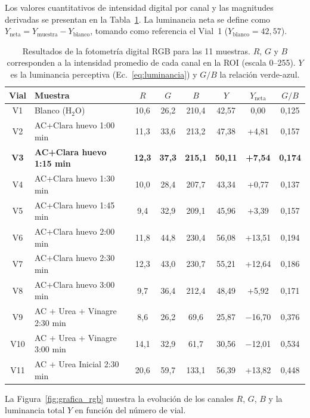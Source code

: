 Los valores cuantitativos de intensidad digital por canal y las magnitudes
derivadas se presentan en la Tabla~\ref{tab:fotometria_rgb}. La luminancia
neta se define como $Y_{\text{neta}} = Y_{\text{muestra}} - Y_{\text{blanco}}$,
tomando como referencia el Vial~1 ($Y_{\text{blanco}} = 42{,}57$).

\begin{table}[htbp]
\centering
\caption{Resultados de la fotometría digital RGB para las 11 muestras.
$R$, $G$ y $B$ corresponden a la intensidad promedio de cada canal en la
ROI (escala 0--255). $Y$ es la luminancia perceptiva (Ec.~\ref{eq:luminancia})
y $G/B$ la relación verde-azul.}
\label{tab:fotometria_rgb}
\small
\begin{tabular}{c l c c c c c c}
\hline
\textbf{Vial} & \textbf{Muestra} & $R$ & $G$ & $B$ & $Y$ & $Y_{\text{neta}}$ & $G/B$ \\
\hline
V1  & Blanco (H$_2$O)           & 10,6 & 26,2 & 210,4 & 42,57 &   0,00 & 0,125 \\
V2  & AC+Clara huevo 1:00 min            & 11,3 & 33,6 & 213,2 & 47,38 &  +4,81 & 0,157 \\
\textbf{V3}  & \textbf{AC+Clara huevo 1:15 min}    & \textbf{12,3} & \textbf{37,3} & \textbf{215,1} & \textbf{50,11} & \textbf{+7,54} & \textbf{0,174} \\
V4  & AC+Clara huevo 1:30 min            & 10,0 & 28,4 & 207,7 & 43,34 &  +0,77 & 0,137 \\
V5  & AC+Clara huevo 1:45 min            &  9,4 & 32,9 & 209,1 & 45,96 &  +3,39 & 0,157 \\
V6  & AC+Clara huevo 2:00 min            & 11,8 & 44,8 & 230,4 & 56,08 & +13,51 & 0,194 \\
V7  & AC+Clara huevo 2:30 min            & 12,3 & 43,0 & 230,7 & 55,21 & +12,64 & 0,186 \\
V8  & AC+Clara huevo 3:00 min            &  9,7 & 36,4 & 212,4 & 48,49 &  +5,92 & 0,171 \\
V9  & AC + Urea + Vinagre 2:30 min  &  8,6 & 26,2 &  69,6 & 25,87 & $-$16,70 & 0,376 \\
V10 & AC + Urea + Vinagre 3:00 min  & 14,1 & 32,9 &  61,7 & 30,56 & $-$12,01 & 0,534 \\
V11 & AC + Urea Inicial 2:30 min    & 20,6 & 59,7 & 133,1 & 56,39 & +13,82 & 0,448 \\
\hline
\end{tabular}
\end{table}

La Figura~\ref{fig:grafica_rgb} muestra la evolución de los canales $R$,
$G$, $B$ y la luminancia total $Y$ en función del número de vial.

